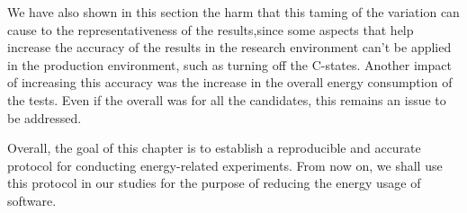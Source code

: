 We have also shown in this section the harm that this taming of the variation can cause to the representativeness of the results,since some aspects that help increase the accuracy of the results in the research environment can't be applied in the production environment, such as turning off the C-states. Another impact of increasing this accuracy was the increase in the overall energy consumption of the tests. Even if the overall was for all the candidates, this remains an issue to be addressed.

Overall, the goal of this chapter is to establish a reproducible and accurate protocol for conducting energy-related experiments. From now on, we shall use this protocol in our studies for the purpose of reducing the energy usage of software.







